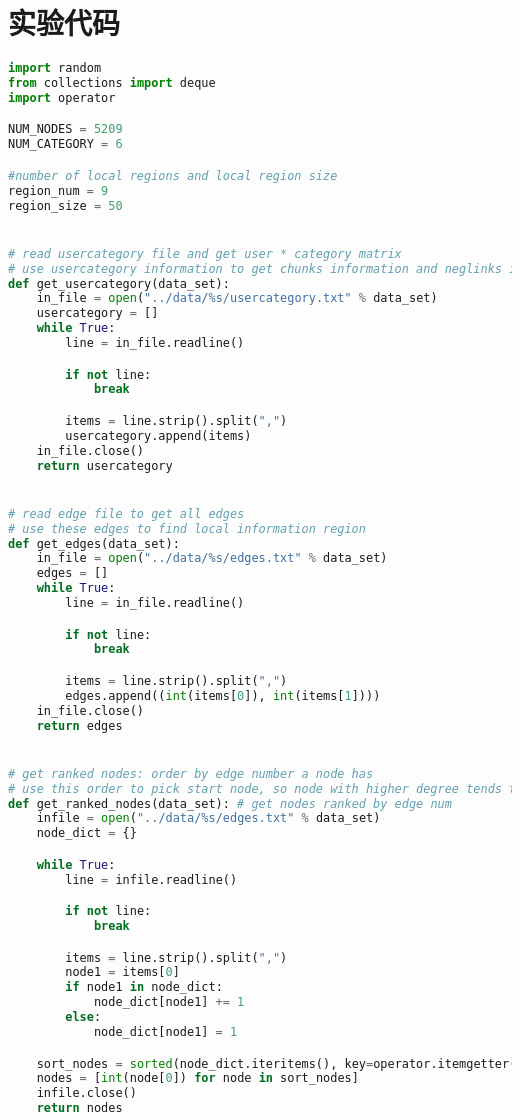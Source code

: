 \chapter{实验代码}
\label{chap:code}

\begin{lstlisting}[language={python}, caption={生成正语境限制和负语境限制}, label=code:constraint]
import random
from collections import deque
import operator

NUM_NODES = 5209
NUM_CATEGORY = 6

#number of local regions and local region size
region_num = 9
region_size = 50


# read usercategory file and get user * category matrix
# use usercategory information to get chunks information and neglinks information
def get_usercategory(data_set):
    in_file = open("../data/%s/usercategory.txt" % data_set)
    usercategory = []
    while True:
        line = in_file.readline()

        if not line:
            break

        items = line.strip().split(",")
        usercategory.append(items)
    in_file.close()
    return usercategory


# read edge file to get all edges
# use these edges to find local information region
def get_edges(data_set):
    in_file = open("../data/%s/edges.txt" % data_set)
    edges = []
    while True:
        line = in_file.readline()

        if not line:
            break

        items = line.strip().split(",")
        edges.append((int(items[0]), int(items[1])))
    in_file.close()
    return edges


# get ranked nodes: order by edge number a node has
# use this order to pick start node, so node with higher degree tends to be picked earlier
def get_ranked_nodes(data_set): # get nodes ranked by edge num
    infile = open("../data/%s/edges.txt" % data_set)
    node_dict = {}

    while True:
        line = infile.readline()

        if not line:
            break

        items = line.strip().split(",")
        node1 = items[0]
        if node1 in node_dict:
            node_dict[node1] += 1
        else:
            node_dict[node1] = 1

    sort_nodes = sorted(node_dict.iteritems(), key=operator.itemgetter(1), reverse=True)
    nodes = [int(node[0]) for node in sort_nodes]
    infile.close()
    return nodes


\end{lstlisting}
